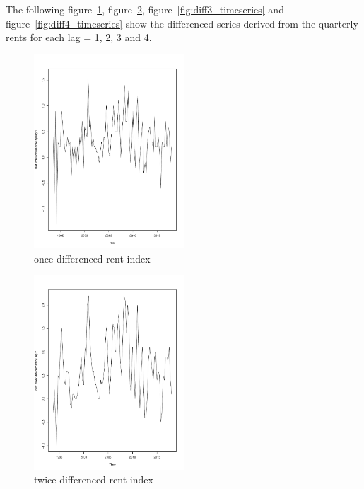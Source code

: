 \documentclass[11pt,a4paper]{article}
\begin{document}
The following figure~\ref{fig:diff1_timeseries}, figure~\ref{fig:diff2_timeseries}, figure~\ref{fig:diff3_timeseries} and figure~\ref{fig:diff4_timeseries} show the differenced series derived from the quarterly rents for each lag = 1, 2, 3 and 4.
\begin{figure}
\centering
\includegraphics[angle=0,
width=0.5\textwidth]{diff1_timeseries}
\caption{once-differenced rent index
\label{fig:diff1_timeseries}}
\end{figure}
\begin{figure}
\centering
\includegraphics[angle=0,
width=0.5\textwidth]{diff2_timeseries}
\caption{twice-differenced rent index
\label{fig:diff2_timeseries}}
\end{figure}
\end{document}
